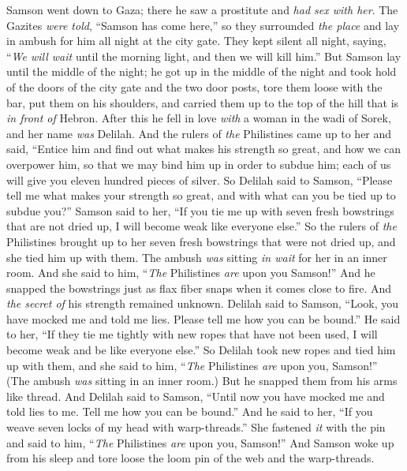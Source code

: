 \begin{biblechapter} %
 Samson went down to Gaza; there he saw a prostitute and \textit{had sex with her}.
\verse The Gazites \textit{were told}, “Samson has come here,” so they surrounded \textit{the place} and lay in ambush for him all night at the city gate. They kept silent all night, saying, “\textit{We will wait} until the morning light, and then we will kill him.”
\verse But Samson lay until the middle of the night; he got up in the middle of the night and took hold of the doors of the city gate and the two door posts, tore them loose with the bar, put them on his shoulders, and carried them up to the top of the hill that is \textit{in front of} Hebron.
\verse After this he fell in love \textit{with} a woman in the wadi of Sorek, and her name \textit{was} Delilah.
\verse And the rulers of \textit{the} Philistines came up to her and said, “Entice him and find out what makes his strength so great, and how we can overpower him, so that we may bind him up in order to subdue him; each of us will give you eleven hundred pieces of silver.
\verse So Delilah said to Samson, “Please tell me what makes your strength so great, and with what can you be tied up to subdue you?”
\verse Samson said to her, “If you tie me up with seven fresh bowstrings that are not dried up, I will become weak like everyone else.”
\verse So the rulers of \textit{the} Philistines brought up to her seven fresh bowstrings that were not dried up, and she tied him up with them.
\verse The ambush \textit{was} sitting \textit{in wait} for her in an inner room. And she said to him, “\textit{The} Philistines \textit{are} upon you Samson!” And he snapped the bowstrings just as flax fiber snaps when it comes close to fire. And \textit{the secret of} his strength remained unknown.
\verse Delilah said to Samson, “Look, you have mocked me and told me lies. Please tell me how you can be bound.”
\verse He said to her, “If they tie me tightly with new ropes that have not been used, I will become weak and be like everyone else.”
\verse So Delilah took new ropes and tied him up with them, and she said to him, “\textit{The} Philistines \textit{are} upon you, Samson!” (The ambush \textit{was} sitting in an inner room.) But he snapped them from his arms like thread.
\verse And Delilah said to Samson, “Until now you have mocked me and told lies to me. Tell me how you can be bound.” And he said to her, “If you weave seven locks of my head with warp-threads.”
\verse She fastened \textit{it} with the pin and said to him, “\textit{The} Philistines \textit{are} upon you, Samson!” And Samson woke up from his sleep and tore loose the loom pin of the web and the warp-threads.

\end{biblechapter}
